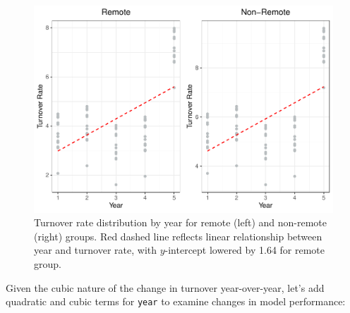 \documentclass[
]{book}
\begin{document}
\begin{figure}

{\centering \includegraphics[width=1\linewidth]{People_Analytics_Lifecycle_files/figure-latex/ps-turnover-yrly-dist-1} 

}

\caption{Turnover rate distribution by year for remote (left) and non-remote (right) groups. Red dashed line reflects linear relationship between year and turnover rate, with $y$-intercept lowered by 1.64 for remote group.}\label{fig:ps-turnover-yrly-dist}
\end{figure}

Given the cubic nature of the change in turnover year-over-year, let's add quadratic and cubic terms for \texttt{year} to examine changes in model performance:

\providecommand{\docline}[3]{\noalign{\global\setlength{\arrayrulewidth}{#1}}\arrayrulecolor[HTML]{#2}\cline{#3}}

\setlength{\tabcolsep}{2pt}

\renewcommand*{\arraystretch}{1.5}
\end{document}

